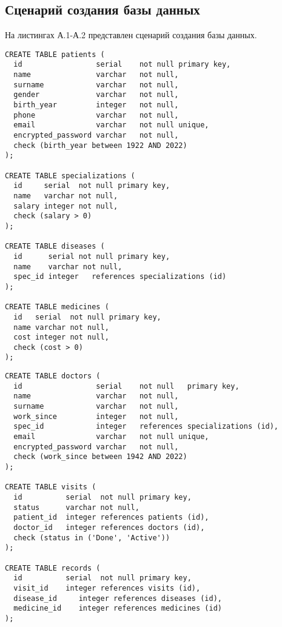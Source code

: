 \begin{appendices}
\chapter{Сценарий создания базы данных}

На листингах А.1-А.2 представлен сценарий создания базы данных.

\begin{lstlisting}[caption={Сценарий создания базы данных}]
CREATE TABLE patients (
  id                 serial    not null primary key,
  name               varchar   not null,
  surname            varchar   not null,
  gender             varchar   not null,
  birth_year         integer   not null,
  phone              varchar   not null,
  email              varchar   not null unique,
  encrypted_password varchar   not null,
  check (birth_year between 1922 AND 2022)
);

CREATE TABLE specializations (
  id     serial  not null primary key,
  name   varchar not null,
  salary integer not null,
  check (salary > 0)
);

CREATE TABLE diseases (
  id      serial not null primary key,
  name    varchar not null,
  spec_id integer   references specializations (id)
);

CREATE TABLE medicines (
  id   serial  not null primary key,
  name varchar not null,
  cost integer not null,
  check (cost > 0)
);

\end{lstlisting}
\clearpage
\begin{lstlisting}[caption={Сценарий создания базы данных(продолжение)}]
CREATE TABLE doctors (
  id                 serial    not null   primary key,
  name               varchar   not null,
  surname            varchar   not null,
  work_since         integer   not null,
  spec_id            integer   references specializations (id),
  email              varchar   not null unique,
  encrypted_password varchar   not null,
  check (work_since between 1942 AND 2022)
);

CREATE TABLE visits (
  id          serial  not null primary key,
  status      varchar not null,
  patient_id  integer references patients (id),
  doctor_id   integer references doctors (id),
  check (status in ('Done', 'Active'))
);

CREATE TABLE records (
  id          serial  not null primary key,
  visit_id    integer references visits (id),
  disease_id     integer references diseases (id),
  medicine_id    integer references medicines (id)
);


\end{lstlisting}
\end{appendices}
